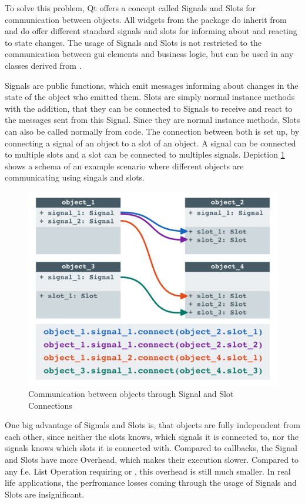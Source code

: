 To solve this problem, Qt offers a concept called Signals and Slots for
communication between objects. All widgets from the package
 do inherit from
 and do offer different standard signals and
slots for informing about and reacting to state changes. The usage of Signals
and Slots is not restricted to the communication between \gls{gui} elements and
business logic, but can be used in any classes derived from
.

Signals are public functions, which emit messages informing about changes in the
state of the object who emitted them. Slots are simply normal instance methods
with the addition, that they can be connected to Signals to receive and react to
the messages sent from this Signal. Since they are normal instance methods,
Slots can also be called normally from code. The connection between both is set
up, by connecting a signal of an object to a slot of an object. A signal can be
connected to multiple slots and a slot can be connected to multiples signals.
Depiction \ref{fig:qt:signalsslots} shows a schema of an example scenario where
different objects are communicating using singals and slots.

\begin{figure}[h]
    \centering
    \includegraphics[width=12cm]{resources/img/QtSignalsSlots}
    \caption{Communication between objects through Signal and Slot Connections}
    \label{fig:qt:signalsslots}
\end{figure}

One big advantage of Signals and Slots is, that objects are fully independent
from each other, since neither the slots knows, which signals it is connected
to, nor the signals knows which slots it is connected with. Compared to
callbacks, the Signal and Slots have more Overhead, which makes their execution
slower. Compared to any f.e. List Operation requiring  or
, this overhead is still much smaller. In real life
applications, the perfromance losses coming through the usage of Signals and
Slots are insignificant.  \cite{QtSignalsAndSlots, PythonGui1}

